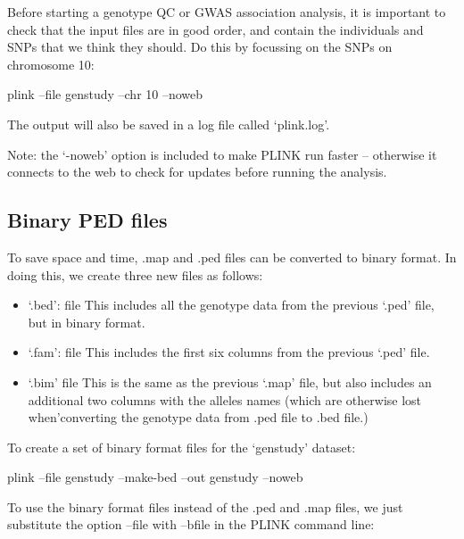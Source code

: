 \documentclass[]{book}
\newenvironment{Shaded}{\begin{snugshade}}{\end{snugshade}}
\newcommand{\ExtensionTok}[1]{#1}
\newcommand{\NormalTok}[1]{#1}
\providecommand{\tightlist}{%
  \setlength{\itemsep}{0pt}\setlength{\parskip}{0pt}}
\begin{document}
Before starting a genotype QC or GWAS association analysis, it is
important to check that the input files are in good order, and contain
the individuals and SNPs that we think they should. Do this by focussing
on the SNPs on chromosome 10:

\begin{Shaded}
\begin{Highlighting}[]
\ExtensionTok{plink}\NormalTok{ --file genstudy --chr 10 --noweb}
\end{Highlighting}
\end{Shaded}

The output will also be saved in a log file called `plink.log'.

Note: the `-noweb' option is included to make PLINK run faster --
otherwise it connects to the web to check for updates before running the
analysis.

\subsection{Binary PED files}\label{binary-ped-files}

To save space and time, .map and .ped files can be converted to binary
format. In doing this, we create three new files as follows:

\begin{itemize}
\tightlist
\item
  `.bed': file This includes all the genotype data from the previous
  `.ped' file, but in binary format.
\item
  `.fam': file This includes the first six columns from the previous
  `.ped' file.
\item
  `.bim' file This is the same as the previous `.map' file, but also
  includes an additional two columns with the alleles names (which are
  otherwise lost when'converting the genotype data from .ped file to
  .bed file.)
\end{itemize}

To create a set of binary format files for the `genstudy' dataset:

\begin{Shaded}
\begin{Highlighting}[]
\ExtensionTok{plink}\NormalTok{ --file genstudy --make-bed --out genstudy --noweb}
\end{Highlighting}
\end{Shaded}

To use the binary format files instead of the .ped and .map files, we
just substitute the option --file with --bfile in the PLINK command
line:
\end{document}
